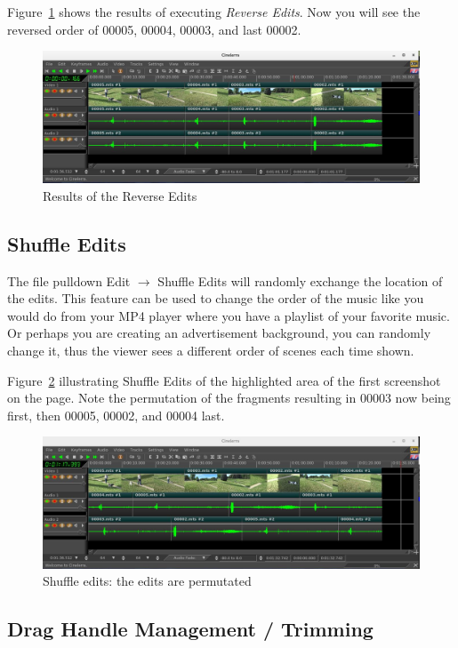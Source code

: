 Figure~\ref{fig:reverse02} shows the results of executing \textit{Reverse Edits}.  Now you will see the reversed order of 00005, 00004, 00003, and last 00002.
\begin{figure}[htpb]
    \centering
    \includegraphics[width=0.8\linewidth]{images/reverse02.png}
    \caption{Results of the Reverse Edits}
    \label{fig:reverse02}
\end{figure}

\subsection{Shuffle Edits}%
\label{sub:shuffle_edits}
 
The file pulldown Edit $\rightarrow$ Shuffle Edits will randomly exchange the location of the edits.  This feature can be used to change the order of the music like you would do from your MP4 player where you have a playlist of your favorite music.  Or perhaps you are creating an advertisement background, you can randomly change it, thus the viewer sees a different order of scenes each time shown.

Figure~\ref{fig:shuffle} illustrating Shuffle Edits of the highlighted area of the first screenshot on the page.  Note the permutation of the fragments resulting in 00003 now being first, then 00005, 00002, and 00004 last.
\begin{figure}[htpb]
    \centering
    \includegraphics[width=0.8\linewidth]{images/shuffle.png}
    \caption{Shuffle edits: the edits are permutated}
    \label{fig:shuffle}
\end{figure}

\subsection{Drag Handle Management / Trimming}%
\label{sub:drag_handle_management_trimming}

